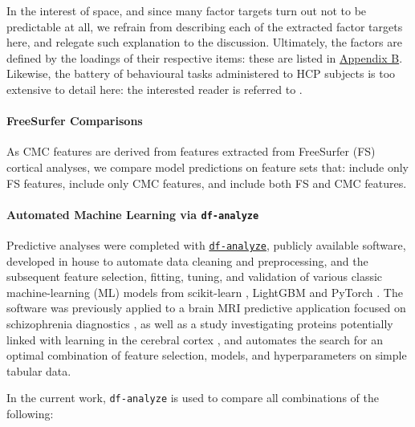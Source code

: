 \documentclass{article}
\begin{document}
%

In the interest of space, and since many factor targets turn out not to be
predictable at all, we refrain from describing each of the extracted factor
targets here, and relegate such explanation to the discussion. Ultimately,
the factors are defined by the loadings of their respective items: these are
listed in \hyperref[sec:appendix-b]{Appendix B}. Likewise, the battery of
behavioural tasks administered to HCP subjects is too extensive to detail
here: the interested reader is referred to \citet{Barch2013}.


\paragraph{FreeSurfer Comparisons}

As CMC features are derived from features extracted from FreeSurfer (FS)
cortical analyses, we compare model predictions on feature sets that: include
only FS features, include only CMC features, and include both FS and CMC
features.

\paragraph{Automated Machine Learning via \texttt{df-analyze}}


Predictive analyses were completed with
\href{github.com/stfxecutables/df-analyze}{\texttt{df-analyze}}, publicly
available software, developed in house to automate data cleaning and
preprocessing, and the subsequent feature selection, fitting, tuning, and
validation of various classic machine-learning (ML) models from scikit-learn
\citep{JMLR:v12:pedregosa11a}, LightGBM \citep{LightGBMNIPS2017} and PyTorch
\citep{Ansel2024PyTorch}. The software was previously applied to a brain MRI
predictive application focused on schizophrenia diagnostics
\citep{levmanMorphologicalStudySchizophrenia2022}, as well as a study
investigating proteins potentially linked with learning in the cerebral
cortex \citep{huangIdentifyingCorticalMolecular2025}, and automates the
search for an optimal combination of feature selection, models, and
hyperparameters on simple tabular data.

In the current work, \texttt{df-analyze} is used to compare all combinations
of the following:
\end{document}
